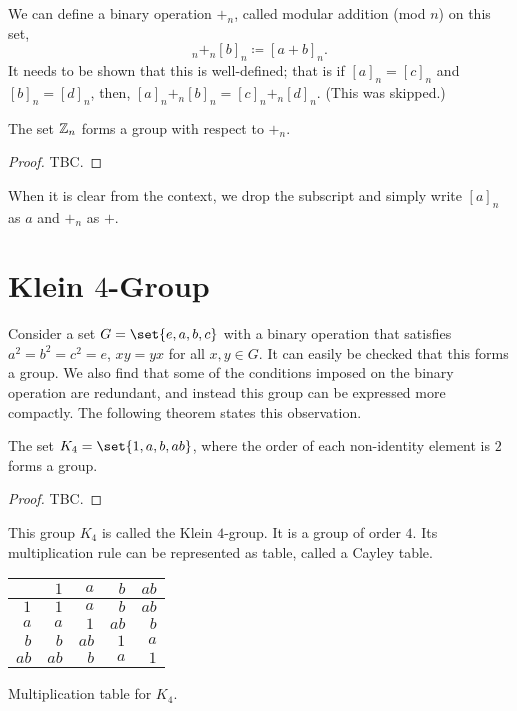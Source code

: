 \documentclass[11pt]{penrose}
\newcommand{\keyword}[1]{\textsf{#1}}
\begin{document}
We can define a binary operation $+_n$, called modular addition (mod $n$) on this set,
\begin{equation*}
    [a]_n +_n [b]_n \coloneq [a + b]_n.
\end{equation*}
It needs to be shown that this is well-defined; that is if $[a]_n = [c]_n$ and $[b]_n = [d]_n$, then, $[a]_n +_n [b]_n = [c]_n +_n [d]_n$. (This was skipped.)

\begin{nthm}
    The set $\mathbb{Z}_n$ forms a group with respect to $+_n$.
\end{nthm}
\begin{proof}
    TBC.
\end{proof}

When it is clear from the context, we drop the subscript and simply write $[a]_n$ as $a$ and $+_n$ as $+$.

\section{\texorpdfstring{Klein $4$-Group}{Klein 4 Group}}
Consider a set $G = \set{e, a, b, c}$ with a binary operation that satisfies $a^2 = b^2 = c^2 = e$, $xy = yx$ for all $x, y \in G$. It can easily be checked that this forms a group. We also find that some of the conditions imposed on the binary operation are redundant, and instead this group can be expressed more compactly. The following theorem states this observation.

\begin{nthm}
    The set $K_4 = \set{1, a, b, ab}$, where the order of each non-identity element is $2$ forms a group.
\end{nthm}
\begin{proof}
    TBC.
\end{proof}

This group $K_4$ is called the \keyword{Klein $4$-group}. It is a group of order $4$. Its multiplication rule can be represented as table, called a Cayley table.
\begin{center}
    \begin{tabularx}{0.3\textwidth}{|R||R|R|R|R|}
        \hline
             & $ 1$ & $ a$ & $ b$ & $ab$ \\ \hline\hline
        $ 1$ & $ 1$ & $ a$ & $ b$ & $ab$ \\ \hline
        $ a$ & $ a$ & $ 1$ & $ab$ & $ b$ \\ \hline
        $ b$ & $ b$ & $ab$ & $ 1$ & $ a$ \\ \hline
        $ab$ & $ab$ & $ b$ & $ a$ & $ 1$ \\ \hline
    \end{tabularx}

    {Multiplication table for $K_4$.}
\end{center}
\end{document}
